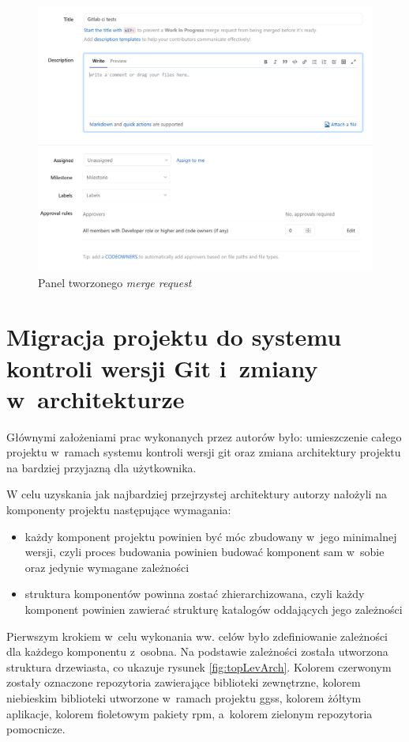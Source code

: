 \begin{figure}[H]
\centering
\includegraphics[width=\textwidth]{res/png/panelMergeRequest}
\caption{Panel tworzonego \textit{merge request}}
\label{fig:mergeRequestPanel}
\end{figure}

\newpage

\section{Migracja projektu do systemu kontroli wersji Git i~zmiany w~architekturze}

Głównymi założeniami prac wykonanych przez autorów było: umieszczenie całego projektu w~ramach systemu kontroli wersji \gls*{git} oraz zmiana architektury projektu na bardziej przyjazną dla użytkownika.

W celu uzyskania jak najbardziej przejrzystej architektury autorzy nałożyli na komponenty projektu następujące wymagania:
\begin{itemize}
\item każdy komponent projektu powinien być móc zbudowany w~jego minimalnej wersji, czyli proces budowania powinien budować komponent sam w~sobie oraz jedynie wymagane zależności
\item struktura komponentów powinna zostać zhierarchizowana, czyli każdy komponent powinien zawierać strukturę katalogów oddających jego zależności
\end{itemize}

Pierwszym krokiem w~celu wykonania ww. celów było zdefiniowanie zależności dla każdego komponentu z~osobna. Na podstawie zależności została utworzona struktura drzewiasta, co ukazuje rysunek \ref{fig:topLevArch}. Kolorem czerwonym zostały oznaczone repozytoria zawierające biblioteki zewnętrzne, kolorem niebieskim biblioteki utworzone w~ramach projektu \gls*{ggss}, kolorem żółtym aplikacje, kolorem fioletowym pakiety \gls*{rpm}, a~kolorem zielonym repozytoria pomocnicze.

